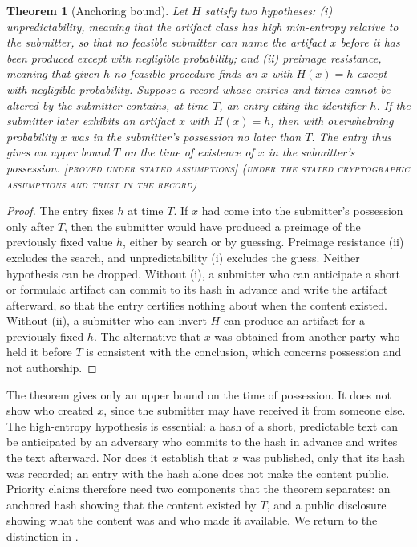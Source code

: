 \documentclass[11pt,twoside,openright]{book}
\theoremstyle{plain}
\newtheorem{theorem}{Theorem}[chapter]
\theoremstyle{definition}
\theoremstyle{remark}
\newcommand{\Proved}{\textup{\textsc{[proved under stated assumptions]}}}
\begin{document}
\begin{theorem}[Anchoring bound]\label{thm:anchor}
Let $H$ satisfy two hypotheses: (i) \emph{unpredictability}, meaning that the artifact class has high min-entropy relative to the submitter, so that no feasible submitter can name the artifact $x$ before it has been produced except with negligible probability; and (ii) \emph{preimage resistance}, meaning that given $h$ no feasible procedure finds an $x$ with $H(x)=h$ except with negligible probability. Suppose a record whose entries and times cannot be altered by the submitter contains, at time $T$, an entry citing the identifier $h$. If the submitter later exhibits an artifact $x$ with $H(x)=h$, then with overwhelming probability $x$ was in the submitter's possession no later than $T$. The entry thus gives an upper bound $T$ on the time of existence of $x$ in the submitter's possession.
\Proved{} \textsc{(under the stated cryptographic assumptions and trust in the record)}
\end{theorem}

\begin{proof}
The entry fixes $h$ at time $T$. If $x$ had come into the submitter's possession only after $T$, then the submitter would have produced a preimage of the previously fixed value $h$, either by search or by guessing. Preimage resistance (ii) excludes the search, and unpredictability (i) excludes the guess. Neither hypothesis can be dropped. Without (i), a submitter who can anticipate a short or formulaic artifact can commit to its hash in advance and write the artifact afterward, so that the entry certifies nothing about when the content existed. Without (ii), a submitter who can invert $H$ can produce an artifact for a previously fixed $h$. The alternative that $x$ was obtained from another party who held it before $T$ is consistent with the conclusion, which concerns possession and not authorship.
\end{proof}

The theorem gives only an upper bound on the time of possession. It does not show who created $x$, since the submitter may have received it from someone else. The high-entropy hypothesis is essential: a hash of a short, predictable text can be anticipated by an adversary who commits to the hash in advance and writes the text afterward. Nor does it establish that $x$ was published, only that its hash was recorded; an entry with the hash alone does not make the content public. Priority claims therefore need two components that the theorem separates: an anchored hash showing that the content existed by $T$, and a public disclosure showing what the content was and who made it available. We return to the distinction in .
\end{document}
